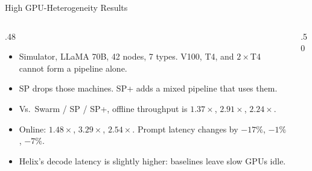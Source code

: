 \begin{frame}[t,label=mm_hx_hetero_01]{High GPU-Heterogeneity Results}

  \par
  \vspace{.02cm}
  \begin{columns}[c,onlytextwidth]
    \begin{column}{.48\textwidth}
      {\footnotesize\begin{itemize}\setlength{\itemsep}{.09cm}
        \item Simulator, LLaMA 70B, 42 nodes, 7 types. V100, T4, and \(2\times\)T4 cannot form a pipeline alone.
        \item SP drops those machines. SP+ adds a mixed pipeline that uses them.
        \item Vs.\ Swarm / SP / SP+, offline throughput is \(1.37\times\), \(2.91\times\), \(2.24\times\).
        \item Online: \(1.48\times\), \(3.29\times\), \(2.54\times\). Prompt latency changes by \(-17\%\), \(-1\%\), \(-7\%\).
        \item Helix's decode latency is slightly higher: baselines leave slow GPUs idle.
      \end{itemize}}
      \vspace{.10cm}
    \end{column}
    \begin{column}{.50\textwidth}
    \end{column}
  \end{columns}
\end{frame}


